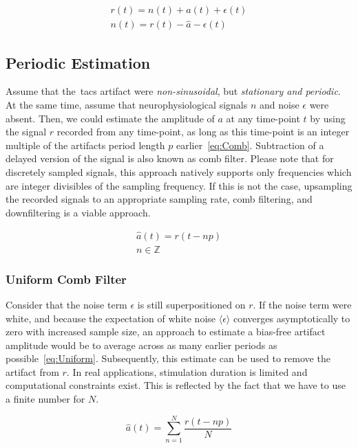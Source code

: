 \documentclass[a4paper]{article}
\begin{document}
\begin{eqnarray}
    r(t) = n(t) + a(t) + \epsilon(t)\\
    n(t) = r(t) - \hat{a} - \epsilon(t)
\end{eqnarray}

\subsection{Periodic Estimation}
Assume that the~\gls{tacs} artifact were \emph{non-sinusoidal}, but \emph{stationary and periodic}. At the same time, assume that neurophysiological signals $n$ and noise $\epsilon$ were absent.
Then, we could estimate the amplitude of $a$ at any time-point $t$ by using the signal $r$ recorded from any time-point, as long as this time-point is an integer multiple of the artifacts period length $p$ earlier~\eqref{eq:Comb}.
Subtraction of a delayed version of the signal is also known as comb filter. Please note that for discretely sampled signals, this approach natively supports only frequencies which are integer divisibles of the sampling frequency. If this is not the case, upsampling the recorded signals to an appropriate sampling rate, comb filtering, and downfiltering is a viable approach.

\begin{eqnarray}
    \hat{a}(t) = r(t-np)\label{eq:Comb}\\
    n \in \mathbb{Z}
\end{eqnarray}

\subsubsection{Uniform Comb Filter}

Consider that the noise term $\epsilon$ is still superpositioned on $r$. If the noise term were white, and because the expectation of white noise $\langle\epsilon\rangle$ converges asymptotically to zero with increased sample size, an approach to estimate a bias-free  artifact amplitude would be to average across as many earlier periods as possible~\eqref{eq:Uniform}.
Subsequently, this estimate can be used to  remove the artifact from $r$.
In real applications, stimulation duration is limited and computational constraints exist. This is reflected by the fact that we have to use a finite number for $N$.

\begin{equation}
    \hat{a}(t) = \sum_{n=1}^{N} \frac{r(t - np)}{N}\label{eq:Uniform}
\end{equation}
\end{document}
